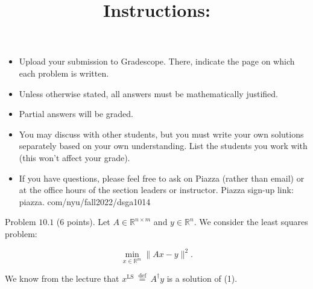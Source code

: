 \documentclass[10pt]{article}
\title{Instructions: }
\author{}
\date{}
\begin{document}
\maketitle
\begin{itemize}
  \item Upload your submission to Gradescope. There, indicate the page on which each problem is written.

  \item Unless otherwise stated, all answers must be mathematically justified.

  \item Partial answers will be graded.

  \item You may discuss with other students, but you must write your own solutions separately based on your own understanding. List the students you work with (this won't affect your grade).

  \item If you have questions, please feel free to ask on Piazza (rather than email) or at the office hours of the section leaders or instructor. Piazza sign-up link: piazza. com/nyu/fall2022/dsga1014

\end{itemize}

Problem $10.1$ (6 points). Let $A \in \mathbb{R}^{n \times m}$ and $y \in \mathbb{R}^{n}$. We consider the least squares problem:

$$
\min _{x \in \mathbb{R}^{m}}\|A x-y\|^{2} .
$$

We know from the lecture that $x^{\mathrm{LS}} \stackrel{\text { def }}{=} A^{\dagger} y$ is a solution of (1).
\end{document}
